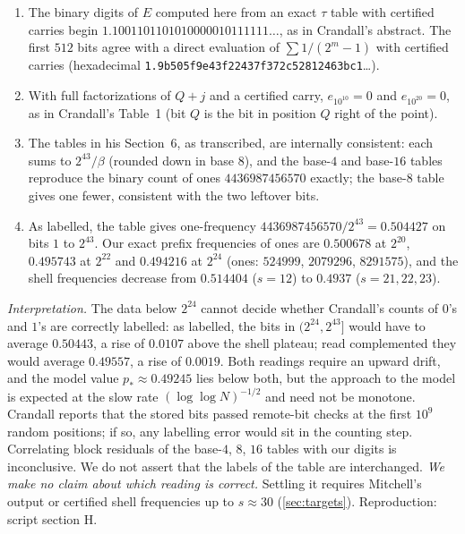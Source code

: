 \documentclass[11pt]{article}
\begin{document}
\begin{proposition}\label{prop:crandall}
\begin{enumerate}[label=(\alph*)]
\item The binary digits of $E$ computed here from an exact $\tau$ table with certified carries begin $1.1001101101010000010111111\ldots$, as in Crandall's abstract. The first $512$ bits agree with a direct evaluation of $\sum1/(2^m-1)$ with certified carries (hexadecimal \texttt{1.9b505f9e43f22437}\allowbreak\texttt{f372c52812463bc1}\dots).
\item With full factorizations of $Q+j$ and a certified carry, $e_{10^{10}}=0$ and $e_{10^{20}}=0$, as in Crandall's Table~1 (bit $Q$ is the bit in position $Q$ right of the point).
\item The tables in his Section~6, as transcribed, are internally consistent: each sums to $2^{43}/\beta$ (rounded down in base $8$), and the base-$4$ and base-$16$ tables reproduce the binary count of ones $4436987456570$ exactly; the base-$8$ table gives one fewer, consistent with the two leftover bits.
\item As labelled, the table gives one-frequency $4436987456570/2^{43}=0.504427$ on bits $1$ to $2^{43}$. Our exact prefix frequencies of ones are $0.500678$ at $2^{20}$, $0.495743$ at $2^{22}$ and $0.494216$ at $2^{24}$ (ones: $524999$, $2079296$, $8291575$), and the shell frequencies decrease from $0.514404$ ($s=12$) to $0.4937$ ($s=21,22,23$).
\end{enumerate}
\end{proposition}

\emph{Interpretation.} The data below $2^{24}$ cannot decide whether Crandall's counts of $0$'s and $1$'s are correctly labelled: as labelled, the bits in $(2^{24},2^{43}]$ would have to average $0.50443$, a rise of $0.0107$ above the shell plateau; read complemented they would average $0.49557$, a rise of $0.0019$. Both readings require an upward drift, and the model value $p_*\approx0.49245$ lies below both, but the approach to the model is expected at the slow rate $(\log\log N)^{-1/2}$ and need not be monotone. Crandall reports that the stored bits passed remote-bit checks at the first $10^9$ random positions; if so, any labelling error would sit in the counting step. Correlating block residuals of the base-$4$, $8$, $16$ tables with our digits is inconclusive. We do not assert that the labels of the table are interchanged. \emph{We make no claim about which reading is correct.} Settling it requires Mitchell's output or certified shell frequencies up to $s\approx30$ (\cref{sec:targets}). Reproduction: script section H.
\end{document}
